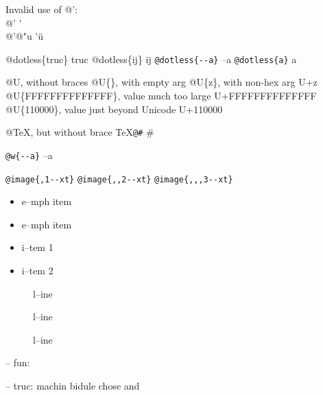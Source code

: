 \documentclass{book}
\begin{document}
Invalid use of @':\leavevmode{}\\
@' \'{}
\leavevmode{}\\
@'@"u \'{}\"{u}

@dotless\{truc\} truc
@dotless\{ij\} ij
\texttt{@dotless\{{-}{-}a\}} --a
\texttt{@dotless\{a\}} a

@U, without braces @U\{\}, with empty arg 
@U\{z\}, with non-hex arg U+z
@U\{FFFFFFFFFFFFFF\}, value much too large U+FFFFFFFFFFFFFF
@U\{110000\}, value just beyond Unicode U+110000

@TeX, but without brace \TeX{}\texttt{@\#} \#

\texttt{@w\{{-}{-}a\}} \hbox{--a}

\texttt{@image\{,1{-}{-}xt\}} 
\texttt{@image\{,,2{-}{-}xt\}} 
\texttt{@image\{,,,3{-}{-}xt\}} 


\begin{itemize}[label=\emph{}]
\item e--mph item
\end{itemize}

\begin{itemize}[label=\emph{} after emph]
\item e--mph item
\end{itemize}

\begin{itemize}[label=\textbullet{} a--n itemize line]
\item i--tem 1
\item i--tem 2
\end{itemize}

\begin{description}
\item[{\parbox[b]{\linewidth}{%
a}}]
l--ine
\end{description}

\begin{description}
\item[{\parbox[b]{\linewidth}{%
a--missing style formatting}}]
l--ine
\end{description}

\begin{description}
\item[{\parbox[b]{\linewidth}{%
a\\
\index[fn]{a@\texttt{a}}%
\index[cp]{index entry between item and itemx}%
b
\index[fn]{b@\texttt{b}}%
}}]
l--ine
\end{description}

\hbox{}-- fun: 


\hbox{}-- truc: machin bidule chose and
\end{document}
